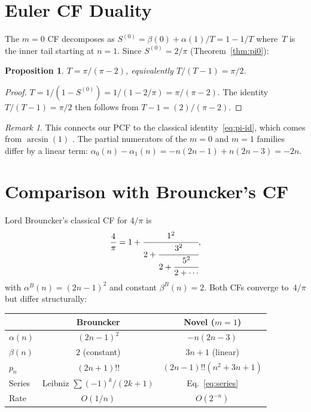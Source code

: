\documentclass[11pt,a4paper]{article}
\theoremstyle{plain}
\newtheorem{proposition}[theorem]{Proposition}
\theoremstyle{definition}
\theoremstyle{remark}
\newtheorem{remark}[theorem]{Remark}
\newcommand{\dff}[1]{(#1)!!}
\begin{document}
\section{Euler CF Duality}\label{sec:euler}

The $m=0$ CF decomposes as
$S^{(0)} = \beta(0) + \alpha(1)/T = 1 - 1/T$
where~$T$ is the inner tail starting at $n = 1$.
Since $S^{(0)} = 2/\pi$ (Theorem~\ref{thm:pi0}):

\begin{proposition}\label{prop:euler}
$T = \pi/(\pi - 2)$, equivalently
$T/(T{-}1) = \pi/2$.
\end{proposition}

\begin{proof}
$T = 1/(1 - S^{(0)}) = 1/(1 - 2/\pi) = \pi/(\pi - 2)$.
The identity $T/(T{-}1) = \pi/2$ then follows from
$T - 1 = (2)/(\pi - 2)$.
\end{proof}

\begin{remark}
This connects our PCF to the classical identity~\eqref{eq:pi-id}, which comes
from $\arcsin(1)$ \citep[\S4.24.2]{dlmf}.
The partial numerators of the $m=0$ and $m=1$ families differ
by a linear term:
$\alpha_0(n) - \alpha_1(n) = -n(2n{-}1) + n(2n{-}3) = -2n$.
\end{remark}

\section{Comparison with Brouncker's CF}\label{sec:brouncker}

Lord Brouncker's classical CF for $4/\pi$ is
\[
  \frac{4}{\pi}
  = 1 + \cfrac{1^2}{2 + \cfrac{3^2}{2 + \cfrac{5^2}{2 + \cdots}}},
\]
with $\alpha^B(n) = (2n{-}1)^2$ and constant $\beta^B(n) = 2$.
Both CFs converge to~$4/\pi$ but differ structurally:

\begin{center}
\begin{tabular}{@{}lcc@{}}
  \toprule
  & \textbf{Brouncker} & \textbf{Novel ($m{=}1$)} \\
  \midrule
  $\alpha(n)$ & $(2n{-}1)^2$ & $-n(2n{-}3)$ \\
  $\beta(n)$ & $2$ (constant) & $3n{+}1$ (linear) \\
  $p_n$ & $(2n{+}1)!!$ & $\dff{2n{-}1}(n^2{+}3n{+}1)$ \\
  Series & Leibniz $\sum (-1)^k/(2k{+}1)$ &
    Eq.~\eqref{eq:series} \\
  Rate & $O(1/n)$ & $O(2^{-n})$ \\
  \bottomrule
\end{tabular}
\end{center}
\end{document}
